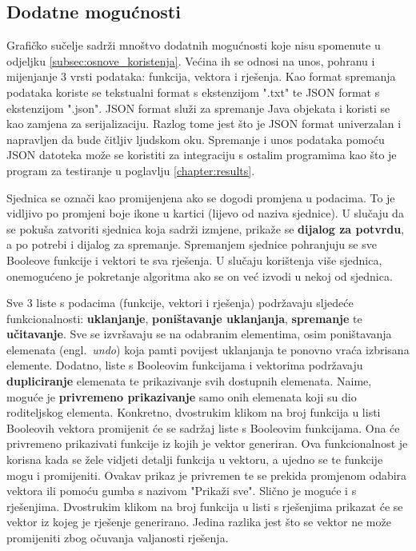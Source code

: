 \documentclass[times, utf8, diplomski]{fer}
\begin{document}
\subsection{Dodatne mogućnosti} \label{subsec:dodatne_mogucnosti}

Grafičko sučelje sadrži mnoštvo dodatnih mogućnosti koje nisu spomenute u odjeljku \ref{subsec:osnove_koristenja}. Većina ih se odnosi na unos, pohranu i mijenjanje $3$ vrsti podataka: funkcija, vektora i rješenja. Kao format spremanja podataka koriste se tekstualni format s ekstenzijom ".txt" te JSON format s ekstenzijom ".json". JSON format služi za spremanje Java objekata i koristi se kao zamjena za serijalizaciju. Razlog tome jest što je JSON format univerzalan i napravljen da bude čitljiv ljudskom oku. Spremanje i unos podataka pomoću JSON datoteka može se koristiti za integraciju s ostalim programima kao što je program za testiranje u poglavlju \ref{chapter:results}.

Sjednica se označi kao promijenjena ako se dogodi promjena u podacima. To je vidljivo po promjeni boje ikone u kartici (lijevo od naziva sjednice). U slučaju da se pokuša zatvoriti sjednica koja sadrži izmjene, prikaže se \textbf{dijalog za potvrdu}, a po potrebi i dijalog za spremanje. Spremanjem sjednice pohranjuju se sve Booleove funkcije i vektori te sva rješenja. U slučaju korištenja više sjednica, onemogućeno je pokretanje algoritma ako se on već izvodi u nekoj od sjednica.

Sve $3$ liste s podacima (funkcije, vektori i rješenja) podržavaju sljedeće funkcionalnosti: \textbf{uklanjanje}, \textbf{poništavanje uklanjanja}, \textbf{spremanje} te \textbf{učitavanje}. Sve se izvršavaju se na odabranim elementima, osim poništavanja elemenata (engl.~\textit{undo}) koja pamti povijest uklanjanja te ponovno vraća izbrisana elemente. Dodatno, liste s Booleovim funkcijama i vektorima podržavaju \textbf{dupliciranje} elemenata te prikazivanje svih dostupnih elemenata. Naime, moguće je \textbf{privremeno prikazivanje} samo onih elemenata koji su dio roditeljskog elementa. Konkretno, dvostrukim klikom na broj funkcija u listi Booleovih vektora promijenit će se sadržaj liste s Booleovim funkcijama. Ona će privremeno prikazivati funkcije iz kojih je vektor generiran. Ova funkcionalnost je korisna kada se žele vidjeti detalji funkcija u vektoru, a ujedno se te funkcije mogu i promijeniti. Ovakav prikaz je privremen te se prekida promjenom odabira vektora ili pomoću gumba s nazivom "Prikaži sve". Slično je moguće i s rješenjima. Dvostrukim klikom na broj funkcija u listi s rješenjima prikazat će se vektor iz kojeg je rješenje generirano. Jedina razlika jest što se vektor ne može promijeniti zbog očuvanja valjanosti rješenja.
\end{document}
